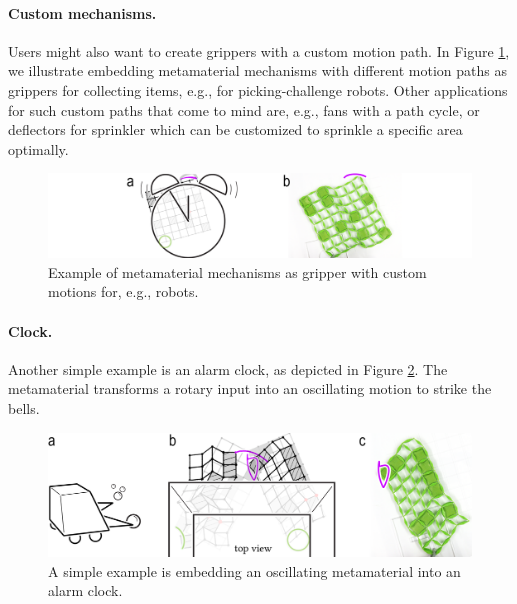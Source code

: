 \paragraph{Custom mechanisms.} Users might also want to create grippers with a custom motion path. In Figure \ref{fig:17-examples-02-oscillating}, we illustrate embedding metamaterial mechanisms with different motion paths as grippers for collecting items, e.g., for picking-challenge robots. Other applications for such custom paths that come to mind are, e.g., fans with a path cycle, or deflectors for sprinkler which can be customized to sprinkle a specific area optimally.

\begin{figure} [h]
    \includegraphics[width=\textwidth]{chapters/understanding-metamaterial-mechanisms-FIG/17-examples-02-oscillating.png}
    \caption[Short figure name.]{Example of metamaterial mechanisms as gripper with custom motions for, e.g., robots.
    \label{fig:17-examples-02-oscillating}}
\end{figure}

\paragraph{Clock.} Another simple example is an alarm clock, as depicted in Figure \ref{fig:18-examples-03-gripper}. The metamaterial transforms a rotary input into an oscillating motion to strike the bells.

\begin{figure} [h]
    \includegraphics[width=\textwidth]{chapters/understanding-metamaterial-mechanisms-FIG/18-examples-03-gripper.png}
    \caption[Short figure name.]{A simple example is embedding an oscillating metamaterial into an alarm clock.
    \label{fig:18-examples-03-gripper}}
\end{figure}


